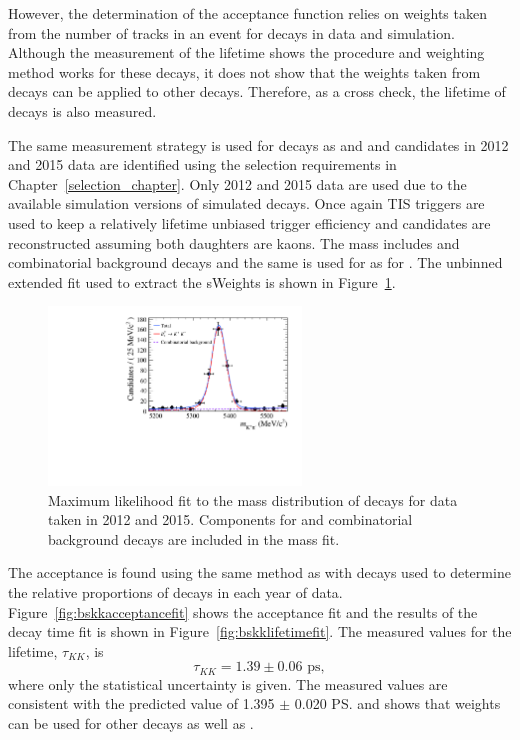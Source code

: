 However, the determination of the \bsmumu acceptance function relies on weights taken from the number of tracks in an event for \bdkpi decays in data and simulation. Although the measurement of the \bdkpi lifetime shows the procedure and weighting method works for these decays, it does not show that the weights taken from \bdkpi decays can be applied to other decays. Therefore, as a cross check, the lifetime of \bskk decays is also measured. 

The same measurement strategy is used for \bskk decays as \bsmumu and \bdkpi and candidates in 2012 and 2015 data are identified using the selection requirements in Chapter~\ref{selection_chapter}. Only 2012 and 2015 data are used due to the available simulation versions of simulated \bskk decays. Once again TIS triggers are used to keep a relatively lifetime unbiased trigger efficiency and candidates are reconstructed assuming both daughters are kaons. The mass \pdf includes \bskk and combinatorial background decays and the same \pdf is used for \bskk as for \bskpi. The unbinned extended \ml fit used to extract the sWeights is shown in Figure~\ref{fig:bskkmassfit}. 

\begin{figure}[tbp]
\centering
  \includegraphics[width=0.6\textwidth]{./Figs/LifetimeSystematics/Bs2KK_mass_fit.pdf}
\caption{Maximum likelihood fit to the mass distribution of \bskk decays for data taken in 2012 and 2015. Components for \bskk and combinatorial background decays are included in the mass fit. }
\label{fig:bskkmassfit}
\end{figure}


The \bskk acceptance is found using the same method as \bsmumu with \bsjpsiphi decays used to determine the relative proportions of decays in each year of data. Figure~\ref{fig:bskkacceptancefit} shows the acceptance fit and the results of the decay time fit is shown in Figure~\ref{fig:bskklifetimefit}. The measured values for the lifetime, $\tau_{KK}$, is
\begin{equation}
\tau_{KK} = 1.39 \pm 0.06  \text{ ps}, 
\end{equation}
where only the statistical uncertainty is given.%
The measured values are consistent with the predicted value of 1.395 $\pm$ 0.020 \ps \cite{Aaij:2014fia} and shows that \bdkpi weights can be used for other decays as well as \bdkpi. 

